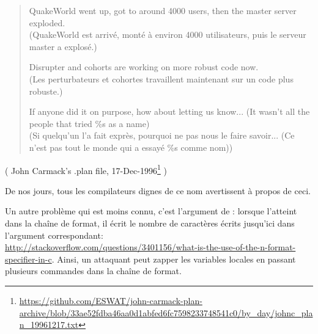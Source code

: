 \begin{framed}
\begin{quotation}
QuakeWorld went up, got to around 4000 users, then the master server exploded.\\
(QuakeWorld est arrivé, monté à environ 4000 utilisateurs, puis le serveur master a explosé.)

Disrupter and cohorts are working on more robust code now.\\
(Les perturbateurs et cohortes travaillent maintenant sur un code plus robuste.)

If anyone did it on purpose, how about letting us know... (It wasn't all the people that tried \%s as a name)\\
(Si quelqu'un l'a fait exprès, pourquoi ne pas nous le faire savoir... (Ce n'est pas tout le monde qui a essayé \%s comme nom))
\end{quotation}
\end{framed}
( John Carmack's .plan file, 17-Dec-1996\footnote{\url{https://github.com/ESWAT/john-carmack-plan-archive/blob/33ae52fdba46aa0d1abfed6fc7598233748541c0/by_day/johnc_plan_19961217.txt}} )

De nos jours, tous les compilateurs dignes de ce nom avertissent à propos de ceci.

Un autre problème qui est moins connu, c'est l'argument  de \printf: lorsque
\printf l'atteint dans la chaîne de format, il écrit le nombre de caractères écrits
jusqu'ici dans l'argument correspondant:\\
\url{http://stackoverflow.com/questions/3401156/what-is-the-use-of-the-n-format-specifier-in-c}.
Ainsi, un attaquant peut zapper les variables locales en passant plusieurs commandes
 dans la chaîne de format.
